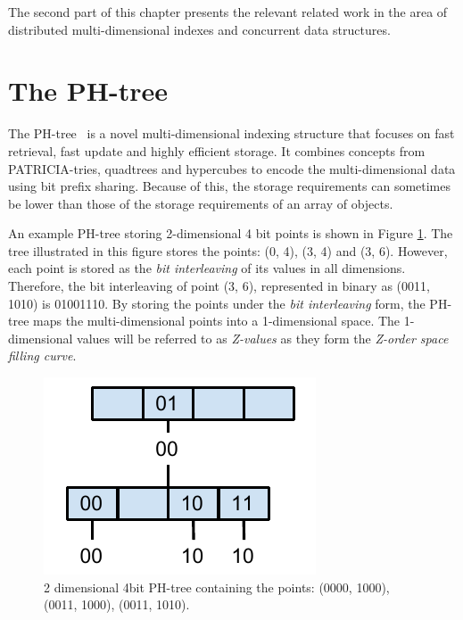 \documentclass[11pt,a4paper]{globis-book}
\begin{document}
The second part of this chapter presents the relevant related work in the area of distributed multi-dimensional indexes and concurrent data structures. 

\section{The PH-tree}
\label{sec:background-phtree}

The PH-tree~\cite{Zaschke2014} is a novel multi-dimensional indexing structure that focuses on fast retrieval, fast update and highly efficient storage. It combines concepts from PATRICIA-tries, quadtrees and hypercubes to encode the multi-dimensional data using bit prefix sharing. Because of this, the storage requirements can sometimes be lower than those of the storage requirements of an array of objects.

An example PH-tree storing 2-dimensional 4 bit points is shown in Figure \ref{fig:PhTree-example}. The tree illustrated in this figure stores the points: (0, 4), (3, 4) and (3, 6). However, each point is stored as the \textit{bit interleaving} of its values in all dimensions. Therefore, the bit interleaving of point (3, 6), represented in binary as (0011, 1010) is 01001110. By storing the points under the \textit{bit interleaving} form, the PH-tree maps the multi-dimensional points into a 1-dimensional space. The 1-dimensional values will be referred to as \textit{Z-values} as they form the \textit{Z-order space filling curve}. 

\begin{figure}[h]
    \centering 
    \includegraphics{images/PhTree-example}
    \caption{2 dimensional 4bit PH-tree containing the points: (0000, 1000), (0011, 1000), (0011, 1010).}
    \label{fig:PhTree-example}
\end{figure}
\end{document}
